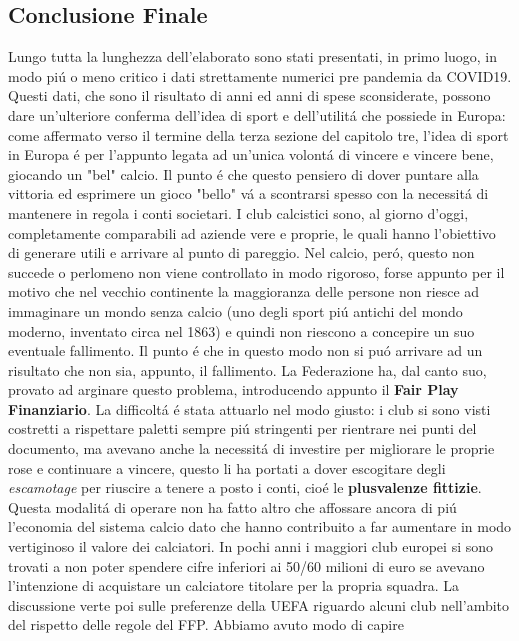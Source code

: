 \documentclass[
    corpo=12pt,
    oneside,
    evenboxes,
    tipotesi=triennale,
    stile=classica,
    oldstyle,
    autoretitolo,
    greek,
]{toptesi}
\begin{document}
\begin{interlinea}{1.5}
\chapter{Conclusione Finale}
Lungo tutta la lunghezza dell'elaborato sono stati presentati, in primo luogo, in modo pi\'u o meno critico i dati strettamente numerici pre pandemia da COVID19.
Questi dati, che sono il risultato di anni ed anni di spese sconsiderate, possono dare un'ulteriore conferma dell'idea di sport e dell'utilit\'a
che possiede in Europa: come affermato verso il termine della terza sezione del capitolo tre, l'idea di sport in Europa \'e per l'appunto legata ad un'unica 
volont\'a di vincere e vincere bene, giocando un "bel" calcio. Il punto \'e che questo pensiero di dover puntare alla vittoria ed esprimere un gioco "bello" 
v\'a a scontrarsi spesso con la necessit\'a di mantenere in regola i conti societari. I club calcistici sono, al giorno d'oggi, completamente
comparabili ad aziende vere e proprie, le quali hanno l'obiettivo di generare utili e arrivare al punto di pareggio. Nel calcio, per\'o, questo 
non succede o perlomeno non viene controllato in modo rigoroso, forse appunto per il motivo che nel vecchio continente la maggioranza delle 
persone non riesce ad immaginare un mondo senza calcio (uno degli sport pi\'u antichi del mondo moderno, inventato circa nel 1863) e quindi non riescono 
a concepire un suo eventuale fallimento. Il punto \'e che in questo modo non si pu\'o arrivare ad un risultato che non sia, appunto, il fallimento. 
La Federazione ha, dal canto suo, provato ad arginare questo problema, introducendo appunto il \textbf{Fair Play Finanziario}. La difficolt\'a 
\'e stata attuarlo nel modo giusto: i club si sono visti costretti a rispettare paletti sempre pi\'u stringenti per rientrare nei punti del documento, 
ma avevano anche la necessit\'a di investire per migliorare le proprie rose e continuare a vincere, questo li ha portati a dover escogitare
degli \emph{escamotage} per riuscire a tenere a posto i conti, cio\'e le \textbf{plusvalenze fittizie}. Questa modalit\'a di operare non ha fatto 
altro che affossare ancora di pi\'u l'economia del sistema calcio dato che hanno contribuito a far aumentare in modo vertiginoso il valore dei calciatori.
In pochi anni i maggiori club europei si sono trovati a non poter spendere cifre inferiori ai 50/60 milioni di euro se avevano l'intenzione di acquistare
un calciatore titolare per la propria squadra.
La discussione verte poi sulle preferenze della UEFA riguardo alcuni club nell'ambito del rispetto delle regole del FFP. Abbiamo avuto modo di capire 

\end{interlinea}
\end{document}
